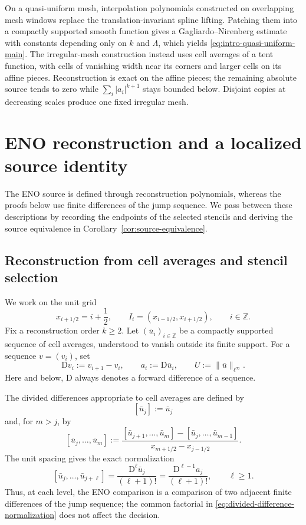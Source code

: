\documentclass[11pt]{amsart}
\theoremstyle{plain}
\theoremstyle{definition}
\theoremstyle{remark}
\numberwithin{equation}{section}
\theoremstyle{plain}
\begin{document}
On a quasi-uniform mesh, interpolation polynomials constructed on overlapping
mesh windows replace the translation-invariant spline lifting.  Patching them
into a compactly supported smooth function gives a Gagliardo--Nirenberg
estimate with constants depending only on $k$ and $\Lambda$, which yields
\eqref{eq:intro-quasi-uniform-main}.  The irregular-mesh construction instead
uses cell averages of a tent function, with cells of vanishing width near its
corners and larger cells on its affine pieces.  Reconstruction is exact on the
affine pieces; the remaining absolute source tends to zero while
$\sum_i|a_i|^{k+1}$ stays bounded below.  Disjoint copies at decreasing
scales produce one fixed irregular mesh.

\section{ENO reconstruction and a localized source identity}
\label{sec:eno-source}

The ENO source is defined through reconstruction polynomials, whereas the
proofs below use finite differences of the jump sequence.
We pass between these descriptions by recording the endpoints of the
selected stencils and deriving the source equivalence in
Corollary~\ref{cor:source-equivalence}.

\subsection{Reconstruction from cell averages and stencil selection}
\label{sec:eno-reconstruction}

We work on the unit grid
\[
x_{i+1/2}=i+\frac12,
\qquad
I_i=(x_{i-1/2},x_{i+1/2}),
\qquad i\in\mathbb Z.
\]
Fix a reconstruction order $k\ge2$.  Let
$(\bar u_i)_{i\in\mathbb Z}$ be a compactly supported sequence of cell
averages, understood to vanish outside its finite support.  For a sequence
$v=(v_i)$, set
\begin{equation}\label{eq:forward-difference}
	\mathrm Dv_i:=v_{i+1}-v_i,
	\qquad
	a_i:=\mathrm D\bar u_i,
	\qquad
	U:=\|\bar u\|_{\ell^\infty}.
\end{equation}
Here and below, $\mathrm D$ always denotes a forward difference of a
sequence.

The divided differences appropriate to cell averages are defined by
\[
[\bar u_j]:=\bar u_j
\]
and, for $m>j$, by
\begin{equation}\label{eq:cell-average-divided-difference}
	[\bar u_j,\ldots,\bar u_m]
	:=
	\frac{[\bar u_{j+1},\ldots,\bar u_m]
		-[\bar u_j,\ldots,\bar u_{m-1}]}
	{x_{m+1/2}-x_{j-1/2}}.
\end{equation}
The unit spacing gives the exact normalization
\begin{equation}\label{eq:divided-difference-normalization}
	[\bar u_j,\ldots,\bar u_{j+\ell}]
	=\frac{\mathrm D^\ell\bar u_j}{(\ell+1)!}
	=\frac{\mathrm D^{\ell-1}a_j}{(\ell+1)!},
	\qquad \ell\ge1.
\end{equation}
Thus, at each level, the ENO comparison is a comparison of two adjacent
finite differences of the jump sequence; the common factorial in
\eqref{eq:divided-difference-normalization} does not affect the decision.
\end{document}
